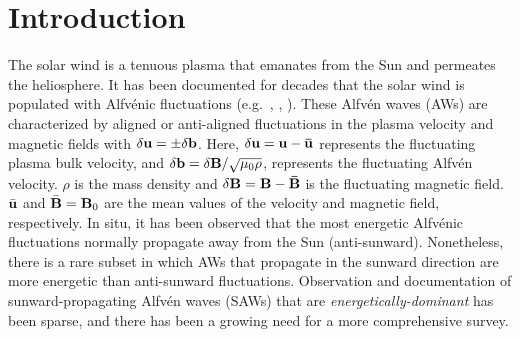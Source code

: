 \documentclass[twocolumn, times]{aastex631}
\begin{document}


\section{Introduction} \label{sec:intro}
The solar wind is a tenuous plasma that emanates from the Sun and permeates the heliosphere. It has been documented for decades that the solar wind is populated with Alfv\'enic fluctuations (e.g.~\cite{burlaga71}, \cite{belcher71}, \cite{volk75}). These Alfv\'en waves (AWs) are characterized by aligned or anti-aligned fluctuations in the plasma velocity and magnetic fields \citep{alfven42} with $\delta {\bf u}=\pm \delta {\bf b}$. Here, $\delta {\bf u} = \bf{u} - \bar{\bf{u}}$ represents the fluctuating plasma bulk velocity, and $\delta {\bf b} = \delta {\bf B}/\sqrt{\mu_0 \rho}$, represents the fluctuating Alfv\'en velocity. $\rho$ is the mass density and $\delta \bf{B} = \bf{B} - \bar{\bf{B}}$ is the fluctuating magnetic field. $\bar{\bf{u}}$ and $\bar{\bf{B}}={\bf B}_0$ are the mean values of the velocity and magnetic field, respectively. In situ, it has been observed that the most energetic Alfvénic fluctuations normally propagate away from the Sun (anti-sunward). Nonetheless, there is a rare subset in which AWs that propagate in the sunward direction are more energetic than anti-sunward fluctuations. Observation and documentation of sunward-propagating Alfv\'en waves (SAWs) that are \emph{energetically-dominant} has been sparse, and there has been a growing need for a more comprehensive survey.
\end{document}
